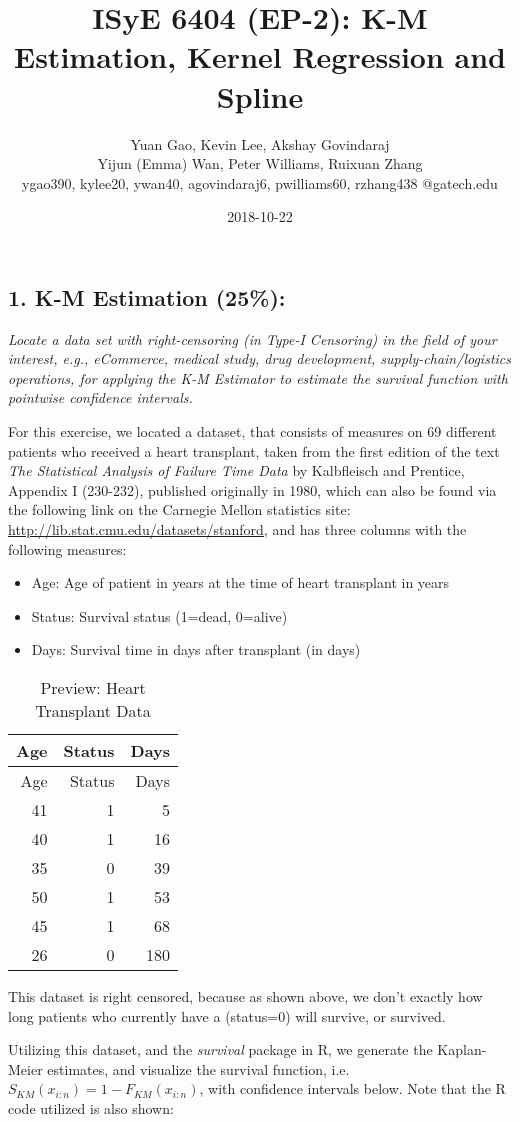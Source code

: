 \documentclass[]{article}
\title{ISyE 6404 (EP-2): K-M Estimation, Kernel Regression and Spline}
\author{Yuan Gao, Kevin Lee, Akshay Govindaraj \\ Yijun (Emma) Wan, Peter Williams, Ruixuan Zhang \\ ygao390, kylee20, ywan40, agovindaraj6, pwilliams60, rzhang438
\textbar{} @gatech.edu}
\date{2018-10-22}
\providecommand{\tightlist}{%
  \setlength{\itemsep}{0pt}\setlength{\parskip}{0pt}}
\begin{document}
\maketitle

{
\setcounter{tocdepth}{2}
\tableofcontents
}
\subsection{1. K-M Estimation (25\%):}\label{k-m-estimation-25}

\emph{Locate a data set with right-censoring (in Type-I Censoring) in
the field of your interest, e.g., eCommerce, medical study, drug
development, supply-chain/logistics operations, for applying the K-M
Estimator to estimate the survival function with pointwise confidence
intervals.}

For this exercise, we located a dataset, that consists of measures on 69
different patients who received a heart transplant, taken from the first
edition of the text \emph{The Statistical Analysis of Failure Time Data}
by Kalbfleisch and Prentice, Appendix I (230-232), published originally
in 1980, which can also be found via the following link on the Carnegie
Mellon statistics site: \url{http://lib.stat.cmu.edu/datasets/stanford},
and has three columns with the following measures:

\begin{itemize}
\tightlist
\item
  Age: Age of patient in years at the time of heart transplant in years
\item
  Status: Survival status (1=dead, 0=alive)
\item
  Days: Survival time in days after transplant (in days)
\end{itemize}

\begin{longtable}[]{@{}rrr@{}}
\caption{Preview: Heart Transplant Data}\tabularnewline
\toprule
Age & Status & Days\tabularnewline
\midrule
\endfirsthead
\toprule
Age & Status & Days\tabularnewline
\midrule
\endhead
41 & 1 & 5\tabularnewline
40 & 1 & 16\tabularnewline
35 & 0 & 39\tabularnewline
50 & 1 & 53\tabularnewline
45 & 1 & 68\tabularnewline
26 & 0 & 180\tabularnewline
\bottomrule
\end{longtable}

This dataset is right censored, because as shown above, we don't exactly
how long patients who currently have a (status=0) will survive, or
survived.

Utilizing this dataset, and the \emph{survival} package in R, we
generate the Kaplan-Meier estimates, and visualize the survival
function, i.e. \(S_{KM}(x_{i:n}) = 1 - F_{KM}(x_{i:n})\), with
confidence intervals below. Note that the R code utilized is also shown:
\end{document}
